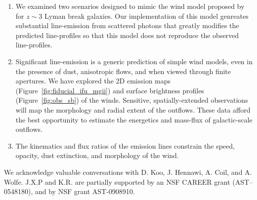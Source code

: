 \documentclass[12pt,preprint]{aastex}
\begin{document}
\begin{enumerate}
\item We examined two scenarios designed to mimic the wind model
  proposed by \cite{steidel10} for $z \sim 3$ Lyman break galaxies.  Our
  implementation of this model genreates substantial line-emission
  from scattered photons that greatly modifies the predicted
  line-profiles so that this model does not reproduce the observed
  line-profiles. 


\item Significant line-emission is a generic prediction of simple wind
  models, even in the presence of dust, anisotropic flows, and when
  viewed through finite apertures.  We have explored the 2D emission
  maps (Figure~\ref{fig:fiducial_ifu_mgii}) and surface brightness 
  profiles (Figure~\ref{fig:obs_sb}) of
  the winds.  Sensitive, spatially-extended observations will map the
  morphology and radial extent of the outflows.  These data afford the
  best opportunity to estimate the energetics and mass-flux of
  galactic-scale outflows.

\item The kinematics and flux ratios of the emission lines 
  constrain the %
  speed, opacity, dust extinction, and morphology of the
  wind.



\end{enumerate}

\acknowledgments

We acknowledge valuable conversations with D. Koo, J. Hennawi,
A. Coil, and A. Wolfe. 
J.X.P and K.R. are partially supported
by an NSF CAREER grant (AST--0548180), and 
by NSF grant AST-0908910.

\clearpage

%
%



\clearpage







\end{document}
